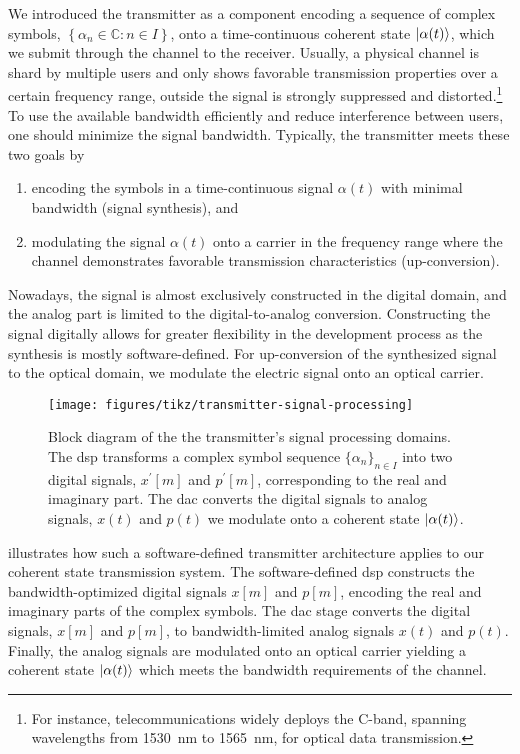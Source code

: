 We introduced the transmitter as a component encoding a sequence of complex symbols, $\left\{\alpha_n\in\mathbb{C}\colon n\in I\right\}$, onto a time-continuous coherent state $\lvert\alpha(t)\rangle$, which we submit through the channel to the receiver.
Usually, a physical channel is shard by multiple users and only shows favorable transmission properties over a certain frequency range, outside the signal is strongly suppressed and distorted.\footnote{For instance, telecommunications widely deploys the C-band, spanning wavelengths from \SI{1530}{\nano\meter} to \SI{1565}{\nano\meter}, for optical data transmission.}
To use the available bandwidth efficiently and reduce interference between users, one should minimize the signal bandwidth.
Typically, the transmitter meets these two goals by
\begin{enumerate}
	\item encoding the symbols in a time-continuous signal $\alpha(t)$ with minimal bandwidth (signal synthesis), and
	\item modulating the signal $\alpha(t)$ onto a carrier in the frequency range where the channel demonstrates favorable transmission characteristics (up-conversion).
\end{enumerate}
Nowadays, the signal is almost exclusively constructed in the digital domain, and the analog part is limited to the digital-to-analog conversion.
Constructing the signal digitally allows for greater flexibility in the development process as the synthesis is mostly software-defined.
For up-conversion of the synthesized signal to the optical domain, we modulate the electric signal onto an optical carrier.
\begin{figure}[htb]
	\centering
	\texttt{[image: figures/tikz/transmitter-signal-processing]}
	\caption{Block diagram of the the transmitter's signal processing domains. The \gls{dsp} transforms a complex symbol sequence $\{\alpha_n\}_{n\in I}$ into two digital signals, $x^\prime[m]$ and $p^\prime[m]$, corresponding to the real and imaginary part. The \gls{dac} converts the digital signals to analog signals, $x(t)$ and $p(t)$ we modulate onto a coherent state $\lvert\alpha(t)\rangle$.}\label{fig:transmitter_signal_processing_domains}
\end{figure}
 illustrates how such a software-defined transmitter architecture applies to our coherent state transmission system.
The software-defined \gls{dsp} constructs the bandwidth-optimized digital signals $x[m]$ and $p[m]$, encoding the real and imaginary parts of the complex symbols.
The \gls{dac} stage converts the digital signals, $x[m]$ and $p[m]$, to bandwidth-limited analog signals $x(t)$ and $p(t)$.
Finally, the analog signals are modulated onto an optical carrier yielding a coherent state $\lvert\alpha(t)\rangle$ which meets the bandwidth requirements of the channel.

